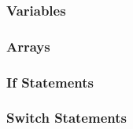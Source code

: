 \subsubsection{Variables}


\subsubsection{Arrays}


\subsubsection{If Statements}


\subsubsection{Switch Statements}

